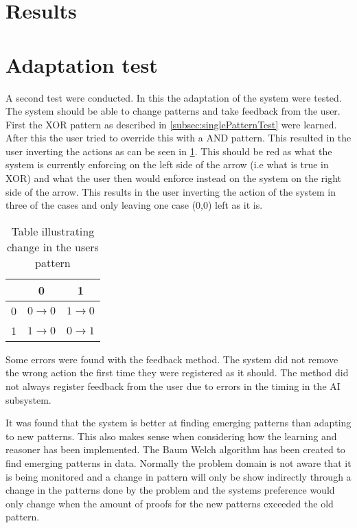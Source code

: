 \section{Results}


\section{Adaptation test}
A second test were conducted. In this the adaptation of the system were tested. The system should be able to change patterns and take feedback from the user. First the XOR pattern as described in \cref{subsec:singlePatternTest} were learned. After this the user tried to override this with a AND pattern. This resulted in the user inverting the actions as can be seen in \cref{Table:userPatternChange}. This should be red as what the system is currently enforcing on the left side of the arrow (i.e what is true in XOR) and what the user then would enforce instead on the system on the right side of the arrow. This results in the user inverting the action of the system in three of the cases and only leaving one case (0,0) left as it is. 


\begin{table}[htbp]
\begin{center}
  \begin{tabular}{| c | c | c |}
    \hline
        & 0                 & 1                 \\ \hline
      0 & $0 \rightarrow 0$ & $1 \rightarrow 0$ \\ \hline
      1 & $1 \rightarrow 0$ & $0 \rightarrow 1$ \\
    \hline
  \end{tabular}
  \caption{Table illustrating change in the users pattern}\label{Table:userPatternChange}
\end{center}
\end{table}

Some errors were found with the feedback method.
The system did not remove the wrong action the first time they were registered as it should.
The method did not always register feedback from the user due to errors in the timing in the AI subsystem.

It was found that the system is better at finding emerging patterns than adapting to new patterns. This also makes sense when considering how the learning and reasoner has been implemented. The Baum Welch algorithm has been created to find emerging patterns in data. Normally the problem domain is not aware that it is being monitored and a change in pattern will only be show indirectly through a change in the patterns done by the problem and the systems preference would only change when the amount of proofs for the new patterns exceeded the old pattern.

